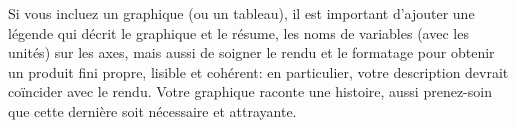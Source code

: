 \documentclass[
  11pt,
  letterpaper,
]{scrbook}
\theoremstyle{definition}
\theoremstyle{remark}
\begin{document}
Si vous incluez un graphique (ou un tableau), il est important d'ajouter
une légende qui décrit le graphique et le résume, les noms de variables
(avec les unités) sur les axes, mais aussi de soigner le rendu et le
formatage pour obtenir un produit fini propre, lisible et cohérent: en
particulier, votre description devrait coïncider avec le rendu. Votre
graphique raconte une histoire, aussi prenez-soin que cette dernière
soit nécessaire et attrayante.

\begin{tcolorbox}[enhanced jigsaw, coltitle=black, left=2mm, opacitybacktitle=0.6, colback=white, leftrule=.75mm, colframe=quarto-callout-note-color-frame, toprule=.15mm, colbacktitle=quarto-callout-note-color!10!white, opacityback=0, bottomtitle=1mm, toptitle=1mm, rightrule=.15mm, title=\textcolor{quarto-callout-note-color}{\faInfo}\hspace{0.5em}{En résumé}, breakable, titlerule=0mm, arc=.35mm, bottomrule=.15mm]


\end{tcolorbox}
\end{document}
